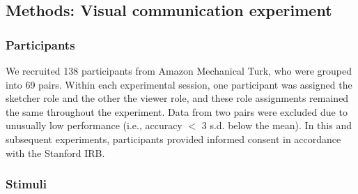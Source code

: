 \documentclass[10pt,letterpaper]{article}
\begin{document}


\subsection{Methods: Visual communication experiment}

\subsubsection{Participants} We recruited 138 participants from Amazon Mechanical Turk, who were grouped into 69 pairs. Within each experimental session, one participant was assigned the sketcher role and the other the viewer role, and these role assignments remained the same throughout the experiment.
Data from two pairs were excluded due to unusually low performance (i.e., accuracy $<$ 3 s.d. below the mean). In this and subsequent experiments, participants provided informed consent in accordance with the Stanford IRB.

\subsubsection{Stimuli}
\end{document}
